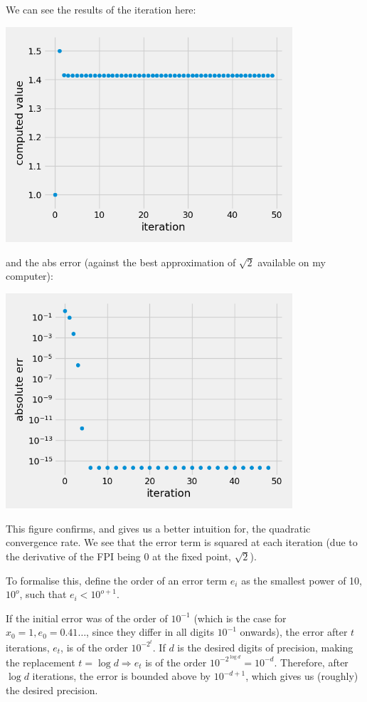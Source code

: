 We can see the results of the iteration here:

\begin{center}
	\includegraphics*[width=0.8\textwidth]{res/1.3-convergence.png}
\end{center}

and the abs error (against the best approximation of $\sqrt{2}$ available on my computer):

\begin{center}
	\includegraphics*[width=0.8\textwidth]{res/1.3-error.png}
\end{center}

This figure confirms, and gives us a better intuition for, the quadratic convergence rate. We see that the error term is squared at each iteration (due to the derivative of the FPI being 0 at the fixed point, $\sqrt{2}$).\bigskip

To formalise this, define the order of an error term $e_i$ as the smallest power of 10, $10^o$, such that $e_i < 10^{o + 1}$.\medskip

If the initial error was of the order of $10^{-1}$ (which is the case for $x_0 = 1, e_0 = 0.41\dots$, since they differ in all digits $10^{-1}$ onwards), the error after $t$ iterations, $e_t$, is of the order $10^{-2^t}$. If $d$ is the desired digits of precision, making the replacement $t = \log d \Rightarrow e_t$ is of the order $10^{-2^{\log d}} = 10^{-d}$. Therefore, after $\log d$ iterations, the error is bounded above by $10^{-d + 1}$, which gives us (roughly) the desired precision. 
